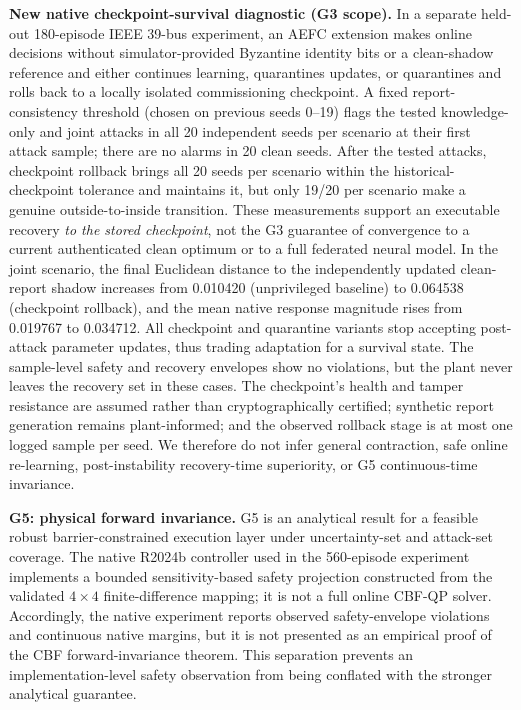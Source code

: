\textbf{New native checkpoint-survival diagnostic (G3 scope).}
In a separate held-out 180-episode IEEE 39-bus experiment, an AEFC extension makes online decisions without simulator-provided Byzantine identity bits or a clean-shadow reference and either continues learning, quarantines updates, or quarantines and rolls back to a locally isolated commissioning checkpoint. A fixed report-consistency threshold (chosen on previous seeds 0--19) flags the tested knowledge-only and joint attacks in all 20 independent seeds per scenario at their first attack sample; there are no alarms in 20 clean seeds. After the tested attacks, checkpoint rollback brings all 20 seeds per scenario within the historical-checkpoint tolerance and maintains it, but only 19/20 per scenario make a genuine outside-to-inside transition. These measurements support an executable recovery \emph{to the stored checkpoint}, not the G3 guarantee of convergence to a current authenticated clean optimum or to a full federated neural model. In the joint scenario, the final Euclidean distance to the independently updated clean-report shadow increases from 0.010420 (unprivileged baseline) to 0.064538 (checkpoint rollback), and the mean native response magnitude rises from 0.019767 to 0.034712. All checkpoint and quarantine variants stop accepting post-attack parameter updates, thus trading adaptation for a survival state. The sample-level safety and recovery envelopes show no violations, but the plant never leaves the recovery set in these cases. The checkpoint's health and tamper resistance are assumed rather than cryptographically certified; synthetic report generation remains plant-informed; and the observed rollback stage is at most one logged sample per seed. We therefore do not infer general contraction, safe online re-learning, post-instability recovery-time superiority, or G5 continuous-time invariance.

\textbf{G5: physical forward invariance.}
G5 is an analytical result for a feasible robust barrier-constrained execution layer under uncertainty-set and attack-set coverage. The native R2024b controller used in the 560-episode experiment implements a bounded sensitivity-based safety projection constructed from the validated $4\times4$ finite-difference mapping; it is not a full online CBF-QP solver. Accordingly, the native experiment reports observed safety-envelope violations and continuous native margins, but it is not presented as an empirical proof of the CBF forward-invariance theorem. This separation prevents an implementation-level safety observation from being conflated with the stronger analytical guarantee.

